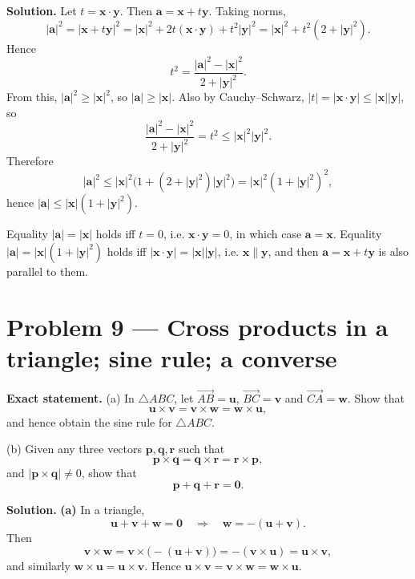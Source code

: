 \documentclass[12pt,a4paper]{article}
\theoremstyle{plain}
\theoremstyle{definition}      %
\begin{document}
\textbf{Solution.}
Let \(t=\mathbf x\cdot \mathbf y\). Then \(\mathbf a=\mathbf x+t\mathbf y\). Taking norms,
\[
|\mathbf a|^2=|\mathbf x+t\mathbf y|^2
=|\mathbf x|^2+2t(\mathbf x\cdot \mathbf y)+t^2|\mathbf y|^2
=|\mathbf x|^2+t^2(2+|\mathbf y|^2).
\]
Hence
\[
t^2=\frac{|\mathbf a|^2-|\mathbf x|^2}{2+|\mathbf y|^2}.
\]
From this, \(|\mathbf a|^2\ge |\mathbf x|^2\), so \(|\mathbf a|\ge |\mathbf x|\).
Also by Cauchy--Schwarz, \(|t|=|\mathbf x\cdot \mathbf y|\le |\mathbf x||\mathbf y|\), so
\[
\frac{|\mathbf a|^2-|\mathbf x|^2}{2+|\mathbf y|^2}=t^2\le |\mathbf x|^2|\mathbf y|^2.
\]
Therefore
\[
|\mathbf a|^2\le |\mathbf x|^2\bigl(1+(2+|\mathbf y|^2)|\mathbf y|^2\bigr)
=|\mathbf x|^2(1+|\mathbf y|^2)^2,
\]
hence \(|\mathbf a|\le |\mathbf x|(1+|\mathbf y|^2)\).

Equality \(|\mathbf a|=|\mathbf x|\) holds iff \(t=0\), i.e. \(\mathbf x\cdot \mathbf y=0\), in which case \(\mathbf a=\mathbf x\).
Equality \(|\mathbf a|=|\mathbf x|(1+|\mathbf y|^2)\) holds iff \(|\mathbf x\cdot\mathbf y|=|\mathbf x||\mathbf y|\), i.e. \(\mathbf x\parallel \mathbf y\),
and then \(\mathbf a=\mathbf x+t\mathbf y\) is also parallel to them.


\section*{Problem 9 — Cross products in a triangle; sine rule; a converse}

\textbf{Exact statement.}
(a) In \(\triangle ABC\), let \(\overrightarrow{AB}=\mathbf u\), \(\overrightarrow{BC}=\mathbf v\) and \(\overrightarrow{CA}=\mathbf w\).
Show that
\[
\mathbf u\times \mathbf v=\mathbf v\times \mathbf w=\mathbf w\times \mathbf u,
\]
and hence obtain the sine rule for \(\triangle ABC\).

(b) Given any three vectors \(\mathbf p,\mathbf q,\mathbf r\) such that
\[
\mathbf p\times \mathbf q=\mathbf q\times \mathbf r=\mathbf r\times \mathbf p,
\]
and \(|\mathbf p\times \mathbf q|\ne 0\), show that
\[
\mathbf p+\mathbf q+\mathbf r=\mathbf 0.
\]

\textbf{Solution.}
\textbf{(a)} In a triangle,
\[
\mathbf u+\mathbf v+\mathbf w=\mathbf 0
\quad\Longrightarrow\quad
\mathbf w=-(\mathbf u+\mathbf v).
\]
Then
\[
\mathbf v\times \mathbf w=\mathbf v\times\bigl(-(\mathbf u+\mathbf v)\bigr)=-(\mathbf v\times\mathbf u)=\mathbf u\times\mathbf v,
\]
and similarly \(\mathbf w\times\mathbf u=\mathbf u\times\mathbf v\). Hence
\(\mathbf u\times\mathbf v=\mathbf v\times\mathbf w=\mathbf w\times\mathbf u\).
\end{document}
